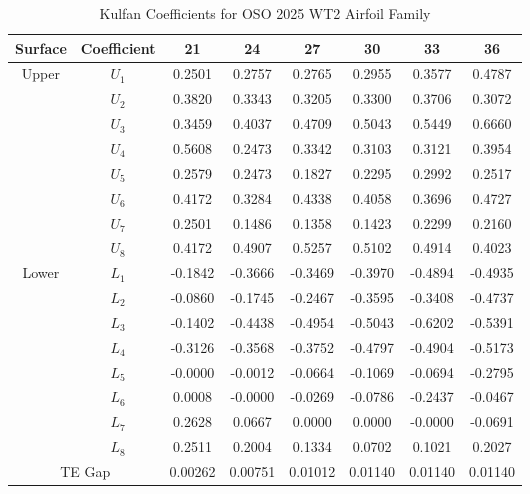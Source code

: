 \begin{table}[htbp]
\centering
\caption{Kulfan Coefficients for OSO 2025 WT2 Airfoil Family}
\label{tab:kulfan_coefficients}
\scriptsize
\begin{tabular}{cccccccc}
\toprule
Surface & Coefficient & 21 & 24 & 27 & 30 & 33 & 36 \\
\midrule
\multirow{8}{*}{Upper} & $U_{1}$ & 0.2501 & 0.2757 & 0.2765 & 0.2955 & 0.3577 & 0.4787 \\
 & $U_{2}$ & 0.3820 & 0.3343 & 0.3205 & 0.3300 & 0.3706 & 0.3072 \\
 & $U_{3}$ & 0.3459 & 0.4037 & 0.4709 & 0.5043 & 0.5449 & 0.6660 \\
 & $U_{4}$ & 0.5608 & 0.2473 & 0.3342 & 0.3103 & 0.3121 & 0.3954 \\
 & $U_{5}$ & 0.2579 & 0.2473 & 0.1827 & 0.2295 & 0.2992 & 0.2517 \\
 & $U_{6}$ & 0.4172 & 0.3284 & 0.4338 & 0.4058 & 0.3696 & 0.4727 \\
 & $U_{7}$ & 0.2501 & 0.1486 & 0.1358 & 0.1423 & 0.2299 & 0.2160 \\
 & $U_{8}$ & 0.4172 & 0.4907 & 0.5257 & 0.5102 & 0.4914 & 0.4023 \\
\midrule
\multirow{8}{*}{Lower} & $L_{1}$ & -0.1842 & -0.3666 & -0.3469 & -0.3970 & -0.4894 & -0.4935 \\
 & $L_{2}$ & -0.0860 & -0.1745 & -0.2467 & -0.3595 & -0.3408 & -0.4737 \\
 & $L_{3}$ & -0.1402 & -0.4438 & -0.4954 & -0.5043 & -0.6202 & -0.5391 \\
 & $L_{4}$ & -0.3126 & -0.3568 & -0.3752 & -0.4797 & -0.4904 & -0.5173 \\
 & $L_{5}$ & -0.0000 & -0.0012 & -0.0664 & -0.1069 & -0.0694 & -0.2795 \\
 & $L_{6}$ & 0.0008 & -0.0000 & -0.0269 & -0.0786 & -0.2437 & -0.0467 \\
 & $L_{7}$ & 0.2628 & 0.0667 & 0.0000 & 0.0000 & -0.0000 & -0.0691 \\
 & $L_{8}$ & 0.2511 & 0.2004 & 0.1334 & 0.0702 & 0.1021 & 0.2027 \\
\midrule
\multicolumn{2}{c}{TE Gap} & 0.00262 & 0.00751 & 0.01012 & 0.01140 & 0.01140 & 0.01140 \\
\bottomrule
\end{tabular}
\end{table}